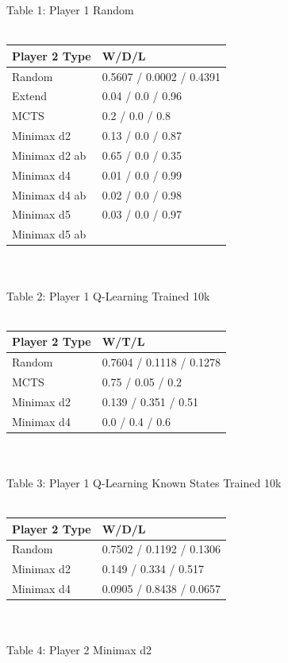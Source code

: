 \documentclass[12pt]{article}
\begin{document}
Table 1: Player 1 Random\\\\
\begin{tabular}{l | l}
Player 2 Type & W/D/L                    \\ \hline
Random        & 0.5607 / 0.0002 / 0.4391 \\
Extend        & 0.04 / 0.0 / 0.96        \\
MCTS          & 0.2 / 0.0 / 0.8          \\
Minimax d2    & 0.13 / 0.0 / 0.87        \\
Minimax d2 ab & 0.65 / 0.0 / 0.35        \\
Minimax d4    & 0.01 / 0.0 / 0.99        \\
Minimax d4 ab & 0.02 / 0.0 / 0.98        \\
Minimax d5    & 0.03 / 0.0 / 0.97        \\
Minimax d5 ab &                         
\end{tabular}\\\\
Table 2: Player 1 Q-Learning Trained 10k\\\\
\begin{tabular}{l|l}
Player 2 Type               & W/T/L                                     \\ \hline
Random     & 0.7604 / 0.1118 / 0.1278 \\
MCTS                        & 0.75 / 0.05 / 0.2  \\                      
Minimax d2 & 0.139 / 0.351 / 0.51     \\
Minimax d4 & 0.0 / 0.4 / 0.6
\end{tabular}\\\\
Table 3: Player 1 Q-Learning Known States Trained 10k\\\\
\begin{tabular}{l|l}
Player 2 Type & W/D/L                    \\ \hline
Random        & 0.7502 / 0.1192 / 0.1306 \\
Minimax d2    & 0.149 / 0.334 / 0.517    \\
Minimax d4    &  0.0905 / 0.8438 / 0.0657                       
\end{tabular}\\\\
Table 4: Player 2 Minimax d2\\\\
\end{document}
